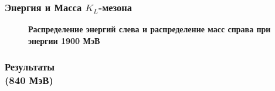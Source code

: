 \documentclass[14pt, hyperref = {colorlinks}]{beamer}
\begin{document}
\begin{frame}
\frametitle{Энергия и Масса $K_{L}$-мезона}
\begin{figure}[h]
\center\textbf{Распределение энергий слева и распределение масс справа при энергии 1900 МэВ}\\
 \begin{minipage}[h]{0.49\linewidth}
  \end{minipage}
  \hfill
  \begin{minipage}[h]{0.49\linewidth}
  \end{minipage}
\end{figure}
\end{frame}

\begin{frame}
\frametitle{Результаты\\(840 МэВ)}
\begin{figure}[h]
\end{figure}
\end{frame}
\end{document}
